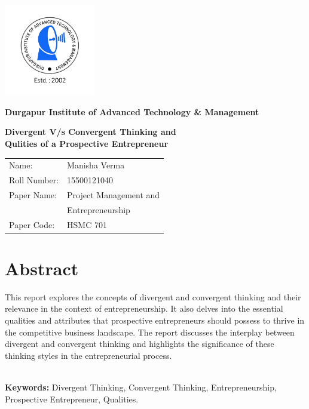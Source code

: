 \documentclass[12pt]{report}
\begin{document}
 

\begin{titlepage}
    \centering
    \includegraphics[width=4cm]{transparent logo.png}

    \Large \textbf{Durgapur Institute of Advanced Technology \& Management}
    \vspace{6cm}

    \Large \textbf{Divergent V/s Convergent Thinking and \\ 
    Qulities of a Prospective Entrepreneur}\par
    \vspace{1cm}
    
    \large
    \begin{tabular}{l l}
        Name: & Manisha Verma \\
        Roll Number: & 15500121040\\
        Paper Name: & Project Management and \\
                     & Entrepreneurship \\
        Paper Code: & HSMC 701
    \end{tabular}
\end{titlepage}

\tableofcontents

\newpage
\section*{Abstract}
This report explores the concepts of divergent and convergent thinking and their relevance in the context of entrepreneurship. It also delves into the essential qualities and attributes that prospective entrepreneurs should possess to thrive in the competitive business landscape. The report discusses the interplay between divergent and convergent thinking and highlights the significance of these thinking styles in the entrepreneurial process.


\textbf{\\Keywords:} Divergent Thinking, Convergent Thinking, Entrepreneurship, Prospective Entrepreneur, Qualities. 
\end{document}

